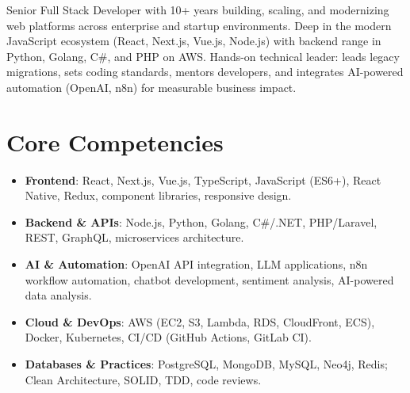 \documentclass[11pt,a4paper,sans]{moderncv}
\begin{document}
\makecvtitle


\vspace{6pt}
\small{Senior Full Stack Developer with 10+ years building, scaling, and modernizing web platforms across enterprise and startup environments. Deep in the modern JavaScript ecosystem (React, Next.js, Vue.js, Node.js) with backend range in Python, Golang, C\#, and PHP on AWS. Hands-on technical leader: leads legacy migrations, sets coding standards, mentors developers, and integrates AI-powered automation (OpenAI, n8n) for measurable business impact.}


\section{Core Competencies}
\vspace{1pt}
\begin{itemize}

\item \textbf{Frontend}: React, Next.js, Vue.js, TypeScript, JavaScript (ES6+), React Native, Redux, component libraries, responsive design.

\item \textbf{Backend \& APIs}: Node.js, Python, Golang, C\#/.NET, PHP/Laravel, REST, GraphQL, microservices architecture.

\item \textbf{AI \& Automation}: OpenAI API integration, LLM applications, n8n workflow automation, chatbot development, sentiment analysis, AI-powered data analysis.

\item \textbf{Cloud \& DevOps}: AWS (EC2, S3, Lambda, RDS, CloudFront, ECS), Docker, Kubernetes, CI/CD (GitHub Actions, GitLab CI).

\item \textbf{Databases \& Practices}: PostgreSQL, MongoDB, MySQL, Neo4j, Redis; Clean Architecture, SOLID, TDD, code reviews.

\end{itemize}

\end{document}
